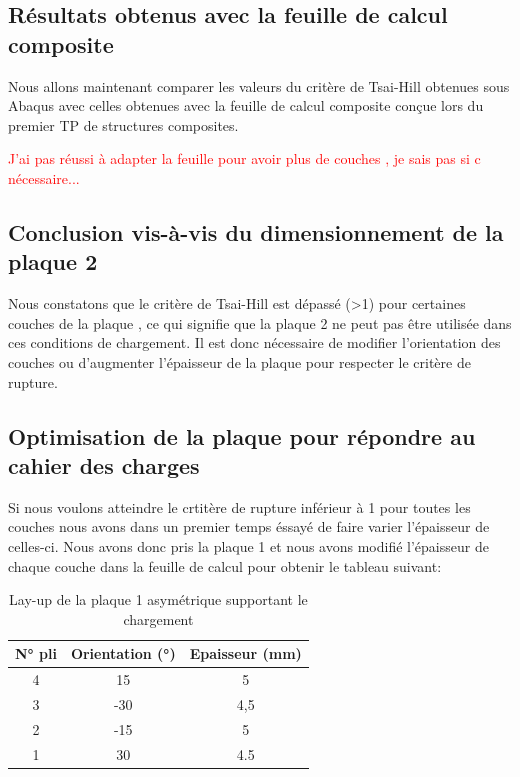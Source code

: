 \documentclass[a4paper,12pt]{article}
\begin{document}
\subsection{Résultats obtenus avec la feuille de calcul composite}
Nous allons maintenant comparer les valeurs du critère de Tsai-Hill obtenues sous Abaqus avec celles obtenues avec la feuille de calcul composite conçue lors du premier TP de structures composites.

\textcolor{red}{J'ai pas réussi à adapter la feuille pour avoir plus de couches , je sais pas si c nécessaire...}

\subsection{Conclusion vis-à-vis du dimensionnement de la plaque 2}
Nous constatons que le critère de Tsai-Hill est dépassé (>1) pour certaines couches de la plaque , ce qui signifie que la plaque 2 ne peut pas être utilisée dans ces conditions de chargement. Il est donc nécessaire de modifier l'orientation des couches ou d'augmenter l'épaisseur de la plaque pour respecter le critère de rupture.

\subsection {Optimisation de la plaque pour répondre au cahier des charges}
Si nous voulons atteindre le crtitère de rupture inférieur à 1 pour toutes les couches nous avons dans un premier temps éssayé de faire varier l'épaisseur de celles-ci. Nous avons donc pris la plaque 1 et nous avons modifié l'épaisseur de chaque couche dans la feuille de calcul pour obtenir le tableau suivant:

\begin{table}[h!]
	\renewcommand{\arraystretch}{1.2} %
	\centering
	\begin{tabular}{c|c|c}
		\textbf{N° pli} & \textbf{Orientation (°)} & \textbf{Epaisseur (mm)} \\
		\hline
		4         & 15              & 5            \\
		3          & -30              & 4,5            \\
		2          & -15              & 5          \\
		1         & 30             & 4.5         \\
	\end{tabular}
	\caption{Lay-up de la plaque 1 asymétrique supportant le chargement}
	\label{tab:lay up opti epaisseur}
\end{table}
\end{document}
